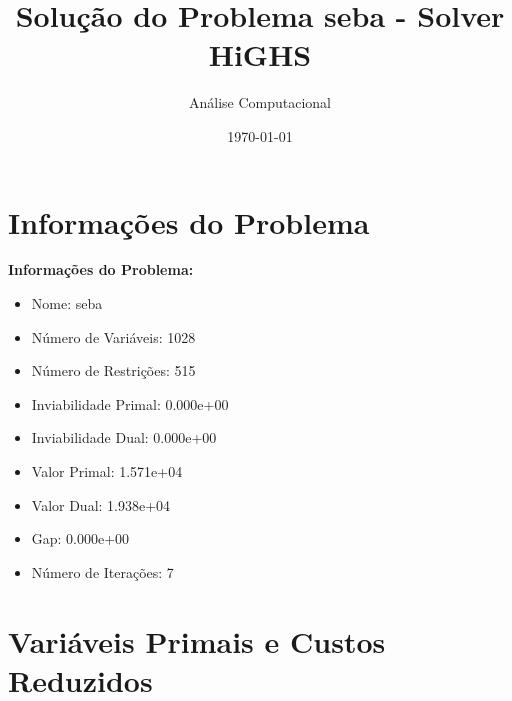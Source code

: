 \documentclass[12pt]{article}
\title{Solução do Problema seba - Solver HiGHS}
\author{Análise Computacional}
\date{\today}
\begin{document}
\maketitle

\section{Informações do Problema}

\textbf{Informações do Problema:}
\begin{itemize}
\item Nome: seba
\item Número de Variáveis: 1028
\item Número de Restrições: 515
\item Inviabilidade Primal: 0.000e+00
\item Inviabilidade Dual: 0.000e+00
\item Valor Primal: 1.571e+04
\item Valor Dual: 1.938e+04
\item Gap: 0.000e+00
\item Número de Iterações: 7
\end{itemize}


\section{Variáveis Primais e Custos Reduzidos}
\end{document}
